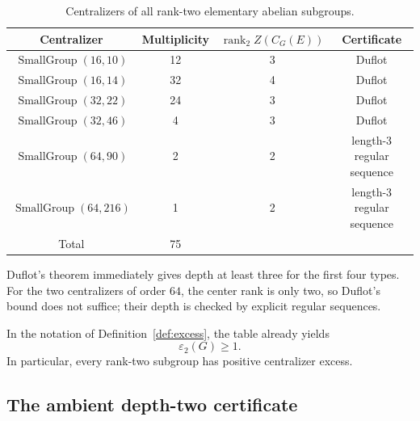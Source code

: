 \documentclass[11pt]{amsart}
\theoremstyle{definition}
\theoremstyle{remark}
\DeclareMathOperator{\rank}{rank}
\newcommand{\SG}[2]{\operatorname{SmallGroup}(#1,#2)}
\begin{document}
\begin{table}[ht]
\centering
\caption{Centralizers of all rank-two elementary abelian subgroups.}
\label{tab:centralizers}
\small
\begin{tabular}{@{}cccc@{}}
\toprule
Centralizer & Multiplicity & \(\rank_2 Z(C_G(E))\) & Certificate \\
\midrule
\(\SG{16}{10}\)  & 12 & 3 & Duflot \\
\(\SG{16}{14}\)  & 32 & 4 & Duflot \\
\(\SG{32}{22}\)  & 24 & 3 & Duflot \\
\(\SG{32}{46}\)  & 4  & 3 & Duflot \\
\(\SG{64}{90}\)  & 2  & 2 & length-3 regular sequence \\
\(\SG{64}{216}\) & 1  & 2 & length-3 regular sequence \\
\midrule
Total & 75 & & \\
\bottomrule
\end{tabular}
\end{table}

Duflot's theorem immediately gives depth at least three for the first four types.  For the two centralizers of order $64$, the center rank is only two, so Duflot's bound does not suffice; their depth is checked by explicit regular sequences.

In the notation of Definition~\ref{def:excess}, the table already yields
\begin{equation}
\label{eq:epsilon2}
\varepsilon_2(G)\geq 1.
\end{equation}
In particular, every rank-two subgroup has positive centralizer excess.

\subsection{The ambient depth-two certificate}
\end{document}
